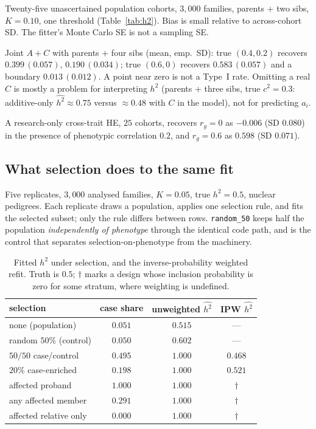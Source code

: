 \documentclass[11pt,a4paper]{article}
\newcommand{\h}{h^{2}}
\begin{document}
Twenty-five unascertained population cohorts, $3{,}000$ families,
parents + two sibs, $K=0.10$, one threshold
(Table~\ref{tab:h2}).
Bias is small relative to across-cohort SD.
The fitter's Monte Carlo SE is not a sampling SE.

\begin{table}[ht]
\centering
\caption{Haseman--Elston data-augmentation fit of liability-scale
$\h$ under the design it is identified in.}
\label{tab:h2}
\small

\end{table}

Joint $A+C$ with parents + four sibs (mean, emp.\ SD):
true $(0.4,0.2)$ recovers $0.399\,(0.057)$, $0.190\,(0.034)$;
true $(0.6,0)$ recovers $0.583\,(0.057)$ and a boundary
$0.013\,(0.012)$.
A point near zero is not a Type~I rate.
Omitting a real $C$ is mostly a problem for interpreting $\h$
(parents + three sibs, true $c^{2}=0.3$: additive-only $\widehat{\h}\approx 0.75$
versus $\approx 0.48$ with $C$ in the model), not for predicting
$a_i$.

A research-only cross-trait HE, $25$ cohorts, recovers $r_g=0$ as
$-0.006$ (SD $0.080$) in the presence of phenotypic correlation
$0.2$, and $r_g=0.6$ as $0.598$ (SD $0.071$).

\subsection{What selection does to the same fit}
\label{sec:ascertainment}

Five replicates, $3{,}000$ analysed families, $K=0.05$, true
$\h=0.5$, nuclear pedigrees.
Each replicate draws a population, applies one selection rule, and
fits the selected subset; only the rule differs between rows.
\texttt{random\_50} keeps half the population \emph{independently of
phenotype} through the identical code path, and is the control that
separates selection-on-phenotype from the machinery.

\begin{table}[ht]
\centering
\caption{Fitted $\h$ under selection, and the inverse-probability
weighted refit. Truth is $0.5$; $\dagger$ marks a design whose
inclusion probability is zero for some stratum, where weighting is
undefined.}
\label{tab:ascertainment}
\small
\begin{tabular}{@{}lccc@{}}
\toprule
selection & case share & unweighted $\widehat{\h}$ & IPW $\widehat{\h}$ \\
\midrule
none (population)      & $0.051$ & $0.515$ & --- \\
random $50\%$ (control)& $0.050$ & $0.602$ & --- \\
$50/50$ case/control   & $0.495$ & $1.000$ & $0.468$ \\
$20\%$ case-enriched   & $0.198$ & $1.000$ & $0.521$ \\
affected proband       & $1.000$ & $1.000$ & $\dagger$ \\
any affected member    & $0.291$ & $1.000$ & $\dagger$ \\
affected relative only & $0.000$ & $1.000$ & $\dagger$ \\
\bottomrule
\end{tabular}
\end{table}
\end{document}
